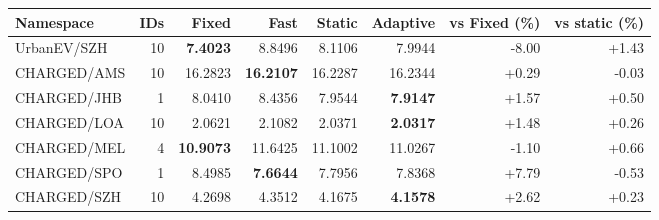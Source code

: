\begin{tabular}{@{}lrrrrrrr@{}}\toprule
Namespace & IDs & Fixed & Fast & Static & Adaptive & vs Fixed (\%) & vs static (\%)\\\midrule
UrbanEV/SZH & 10 & \textbf{7.4023} & 8.8496 & 8.1106 & 7.9944 & -8.00 & +1.43\\
CHARGED/AMS & 10 & 16.2823 & \textbf{16.2107} & 16.2287 & 16.2344 & +0.29 & -0.03\\
CHARGED/JHB & 1 & 8.0410 & 8.4356 & 7.9544 & \textbf{7.9147} & +1.57 & +0.50\\
CHARGED/LOA & 10 & 2.0621 & 2.1082 & 2.0371 & \textbf{2.0317} & +1.48 & +0.26\\
CHARGED/MEL & 4 & \textbf{10.9073} & 11.6425 & 11.1002 & 11.0267 & -1.10 & +0.66\\
CHARGED/SPO & 1 & 8.4985 & \textbf{7.6644} & 7.7956 & 7.8368 & +7.79 & -0.53\\
CHARGED/SZH & 10 & 4.2698 & 4.3512 & 4.1675 & \textbf{4.1578} & +2.62 & +0.23\\
\bottomrule\end{tabular}
